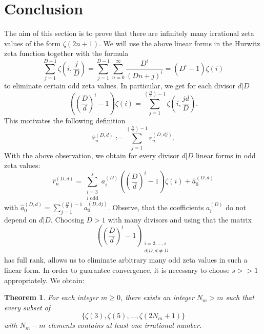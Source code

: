 \documentclass[11pt]{amsart}
\theoremstyle{plain}
\newtheorem{thm}{Theorem}[section]
\theoremstyle{remark}
\theoremstyle{definition}
\begin{document}
\section{Conclusion}
The aim of this section is to prove that there are infinitely many irrational zeta values of the form $\zeta(2n+1)$. We will use the above linear forms in the Hurwitz zeta function together with the formula
\[
	\sum_{j=1}^{D-1}\zeta\left(i,\frac{j}{D}\right)=\sum_{j=1}^{D-1}\sum_{n=0}^\infty \frac{D^i}{(Dn+j)^i}= (D^i-1)\zeta(i)
\]
to eliminate certain odd zeta values. In particular, we get for each divisor $d|D$
\[
	\left(\left(\frac{D}{d}\right)^i-1\right)\zeta(i)=\sum_{j=1}^{(\frac{D}{d})-1}\zeta\left(i,\frac{jd}{D}\right).
\]
This motivates the following definition
\[
	\hat{r}_n^{(D,d)}:=\sum_{j=1}^{(\frac{D}{d})-1} r_n^{(D,dj)}.
\]
With the above observation, we obtain for every divisor $d|D$ linear forms in odd zeta values:
\[
	\hat{r}_n^{(D,d)}=\sum_{\substack{i=3 \\ i \text{ odd}}}^s a^{(D)}_i\left(\left(\frac{D}{d}\right)^i-1\right)\zeta(i)+\hat{a}^{(D,d)}_0
\]
with $\hat{a}^{(D,d)}_0=\sum_{j=1}^{(\frac{D}{d})-1} a_0^{(D,dj)}$. Observe, that the coefficients $a_i^{(D)}$ do not depend on $d|D$. Choosing $D>1$ with many divisors and using that the matrix
\[
	\left(\left(\frac{D}{d}\right)^i-1\right)_{\substack{i=3,...,s \\ d|D, d\neq D}}
\]
has full rank, allows us to eliminate arbitrary many odd zeta values in such a linear form. In order to guarantee convergence, it is necessary to choose $s>>1$ appropriately. We obtain:
\begin{thm}
For each integer $m\geq 0$, there exists an integer $N_m>m$ such that every subset of
\[
	\{\zeta(3),\zeta(5),...,\zeta(2N_m+1)\}
\]
with $N_m-m$ elements contains at least one irrational number.
\end{thm}
\end{document}
